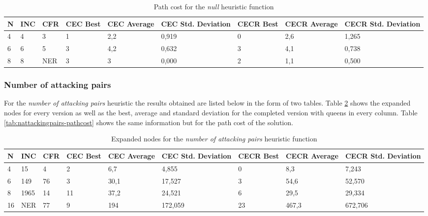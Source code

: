 \documentclass[]{llncs}
\begin{document}
\begin{table}[H]
    \caption{Path cost for the \textit{null} heuristic function}
    \centering
    \resizebox{1 \textwidth}{!} { %
        \begin{tabular}{|l|l|l|l|l|l|l|l|l|}
            \hline
            N & INC & CFR & CEC Best & CEC Average & CEC Std. Deviation & CECR Best & CECR Average & CECR Std. Deviation \\ \hline
            4 & 4 & 3 & 1 & 2,2 & 0,919 & 0	& 2,6 & 1,265 \\
            6 & 6 & 5 & 3 & 4,2 & 0,632 & 3	& 4,1 & 0,738 \\
            8 & 8 & NER & 3 & 3 & 0,000 & 2	& 1,1 & 0,500 \\ \hline
        \end{tabular}
        } %
        \label{tab:h0-pathcost}
\end{table}
\subsubsection{Number of attacking pairs}
For the \textit{number of attacking pairs} heuristic the results obtained are listed below in the form of two tables. Table \ref{tab:nattackingpairs-expanded} shows the expanded nodes for every version as well as the best, average and standard deviation for the completed version with queens in every column. Table \ref{tab:nattackingpairs-pathcost} shows the same information but for the path cost of the solution.

\begin{table}[H]
    \caption{Expanded nodes for the \textit{number of attacking pairs} heuristic function}
    \centering
    \resizebox{1 \textwidth}{!} { %
        \begin{tabular}{|l|l|l|l|l|l|l|l|l|}
            \hline
            N & INC & CFR & CEC Best & CEC Average & CEC Std. Deviation & CECR Best & CECR Average & CECR Std. Deviation \\ \hline
            4 & 15 & 4 & 2 & 6,7 & 4,855 & 0 & 8,3 & 7,243 \\
            6 & 149 & 76 & 3 & 30,1 & 17,527 & 3 & 54,6 & 52,570 \\
            8 & 1965 & 14 & 11 & 37,2 & 24,521 & 6 & 29,5 &	29,334 \\
            16 & NER & 77 & 9 & 194 & 172,059 & 23 & 467,3 & 672,706 \\ \hline
        \end{tabular}
        } %
        \label{tab:nattackingpairs-expanded}
\end{table}
\end{document}

